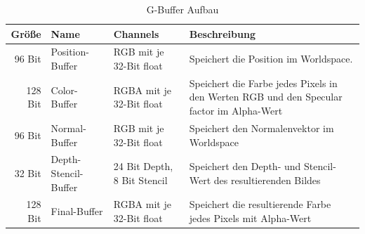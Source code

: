 \begin{table}
	\caption{G-Buffer Aufbau}
	\label{table:GBuffer}
	\centering
	\begin{tabular}{rlll}\toprule[1.5pt]
		Größe & Name & Channels & Beschreibung \\\midrule
		96 Bit  & Position-Buffer & RGB mit je 32-Bit float & Speichert die Position im Worldspace.\\
		128 Bit & Color-Buffer & RGBA mit je 32-Bit float & Speichert die Farbe jedes Pixels in den Werten RGB und den Specular factor im Alpha-Wert \\
		96 Bit & Normal-Buffer & RGB mit je 32-Bit float & Speichert den Normalenvektor im Worldspace \\
		32 Bit & Depth-Stencil-Buffer & 24 Bit Depth, 8 Bit Stencil & Speichert den Depth- und Stencil-Wert des resultierenden Bildes \\
		128 Bit & Final-Buffer & RGBA mit je 32-Bit float & Speichert die resultierende Farbe jedes Pixels mit Alpha-Wert \\\bottomrule[1.5pt]
	\end{tabular}
\end{table}